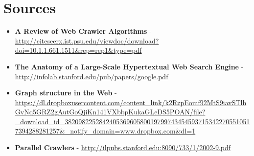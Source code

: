 \documentclass{article}
\begin{document}
	\section{Sources}
	
	\begin{itemize}
		\item \textbf{A Review of Web Crawler Algorithms} -  \url{http://citeseerx.ist.psu.edu/viewdoc/download?doi=10.1.1.661.1511&rep=rep1&type=pdf}
		
		\item \textbf{The Anatomy of a Large-Scale Hypertextual
			Web Search Engine} - \url{http://infolab.stanford.edu/pub/papers/google.pdf}
		
		\item \textbf{Graph structure in the Web} -  \url{https://dl.dropboxusercontent.com/content_link/k2RzpEomf92MtS9iavSTlhGvNq5GRZ2gAutGoQjiKn141VXbbpKukaGLeDS5POAN/file?_download_id=3820982252842405369605800197997434545937153422705510517394288281257&_notify_domain=www.dropbox.com&dl=1}
		
		\item \textbf{Parallel Crawlers} - \url{http://ilpubs.stanford.edu:8090/733/1/2002-9.pdf}
		
	\end{itemize}
	
\end{document}
